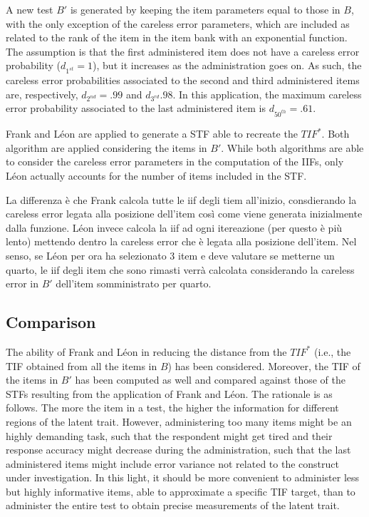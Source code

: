 \documentclass{svproc}
\begin{document}
A new test $B'$ is generated by keeping the item parameters equal to those in $B$, with the only exception of the careless error parameters, which are included as related to the rank of the item in the item bank with an exponential function. 
The assumption is that the first administered item does not have a careless error probability ($d_{1^{st}} = 1$), but it increases as the administration goes on. As such, the careless error probabilities associated to the second and third administered items are, respectively, $d_{2^{nd}} = .99$ and $d_{3^{rd}}.98$. In this application, the maximum careless error probability associated to the last administered item is $d_{50^{th}} = .61$.

\color{blue}
Frank and Léon are applied to generate a STF able to recreate the $TIF^*$. Both algorithm are applied considering the items in $B'$. While both algorithms are able to consider the careless error parameters in the computation of the IIFs, only Léon actually accounts for the number of items included in the STF.

La differenza è che Frank calcola tutte le iif degli tiem all'inizio, consdierando la careless error legata alla posizione dell'item così come viene generata inizialmente dalla funzione. 
Léon invece calcola la iif ad ogni itereazione (per questo è più lento) mettendo dentro la careless error che è legata alla posizione dell'item. Nel senso, se Léon per ora ha selezionato 3 item e deve valutare se metterne un quarto, le iif degli item che sono rimasti verrà calcolata considerando la careless error in $B'$ dell'item somministrato per quarto.
\normalcolor


\subsection{Comparison}

The ability of Frank and Léon in reducing the distance from the $TIF^*$ (i.e., the TIF obtained from all the items in $B$) has been considered. 
Moreover, the TIF of the items in $B'$ has been computed as well and compared against those of the STFs resulting from the application of Frank and Léon. 
The rationale is as follows. The more the item in a test, the higher the information for different regions of the latent trait. 
However, administering too many items might be an highly demanding task, such that the respondent might get tired and their response accuracy might decrease during the administration, such that the last administered items might include error variance not related to the construct under investigation. 
In this light, it should be more convenient to administer less but highly informative items, able to approximate a specific TIF target, than to administer the entire test to obtain precise measurements of the latent trait.
  
\end{document}
